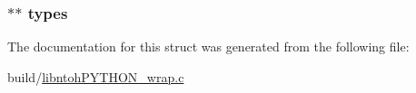 \hypertarget{structswig__module__info_ab3f7a3650d62b94bd66b389d74eec755}{
\subsubsection[{types}]{$\ast$$\ast$ types}}\label{structswig__module__info_ab3f7a3650d62b94bd66b389d74eec755}


The documentation for this struct was generated from the following file\-:\begin{DoxyCompactItemize}
\item 
build/\hyperlink{libntoh_p_y_t_h_o_n__wrap_8c}{libntoh\-P\-Y\-T\-H\-O\-N\-\_\-wrap.\-c}\end{DoxyCompactItemize}
